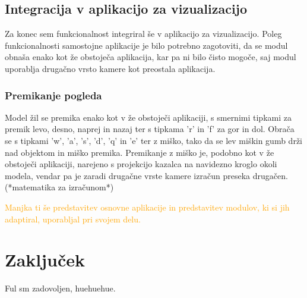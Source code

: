 \documentclass[a4paper, 12pt]{book}
\begin{document}
\section{Integracija v aplikacijo za vizualizacijo}

Za konec sem funkcionalnost integriral še v aplikacijo za vizualizacijo. Poleg funkcionalnosti samostojne aplikacije je bilo potrebno zagotoviti, da se modul obnaša enako kot že obstoječa aplikacija, kar pa ni bilo čisto mogoče, saj modul uporablja drugačno vrsto kamere kot preostala aplikacija. 

\subsection*{Premikanje pogleda}

Model žil se premika enako kot v že obstoječi aplikaciji, s smernimi tipkami za premik levo, desno, naprej in nazaj ter s tipkama 'r' in 'f' za gor in dol. Obrača se s tipkami 'w', 'a', 's', 'd', 'q' in 'e' ter z miško, tako da se lev miškin gumb drži nad objektom in miško premika. Premikanje z miško je, podobno kot v že obstoječi aplikaciji, narejeno s projekcijo kazalca na navidezno kroglo okoli modela, vendar pa je zaradi drugačne vrste kamere izračun preseka drugačen. (*matematika za izračunom*) 

\textcolor{orange}{Manjka ti še predstavitev osnovne aplikacije in predstavitev modulov, ki si jih adaptiral, uporabljal pri svojem delu.}

\chapter{Zaključek}
Ful sm zadovoljen, huehuehue.
\end{document}
